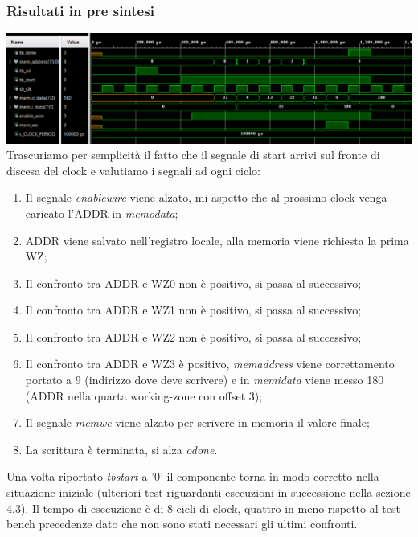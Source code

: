 \documentclass{article}
\begin{document}
\subsubsection{Risultati in pre sintesi}
\includegraphics[width=\textwidth]{tb1.png}
Trascuriamo per semplicità il fatto che il segnale di start arrivi sul fronte di discesa del clock e valutiamo i segnali ad ogni ciclo:
\begin{enumerate}
	\item Il segnale \textit{enable\textunderscore wire} viene alzato, mi aspetto che al prossimo clock venga caricato l'ADDR in \textit{mem\textunderscore o\textunderscore data};
	\item ADDR viene salvato nell'registro locale, alla memoria viene richiesta la prima WZ;
	\item Il confronto tra ADDR e WZ0 non è positivo, si passa al successivo;
	\item Il confronto tra ADDR e WZ1 non è positivo, si passa al successivo;
	\item Il confronto tra ADDR e WZ2 non è positivo, si passa al successivo;
	\item Il confronto tra ADDR e WZ3 è positivo, \textit{mem\textunderscore address} viene correttamento portato a 9 (indirizzo dove deve scrivere) e in \textit{mem\textunderscore i\textunderscore data} viene messo 180 (ADDR nella quarta working-zone con offset 3);
	\item Il segnale \textit{mem\textunderscore we} viene alzato per scrivere in memoria il valore finale;
	\item La scrittura è terminata, si alza \textit{o\textunderscore done}.
\end{enumerate}
Una volta riportato \textit{tb\textunderscore start} a '0' il componente torna in modo corretto nella situazione iniziale (ulteriori test riguardanti esecuzioni in successione nella sezione 4.3).
Il tempo di esecuzione è di 8 cicli di clock, quattro in meno rispetto al test bench precedenze dato che non sono stati necessari gli ultimi confronti.
\newpage
\end{document}
